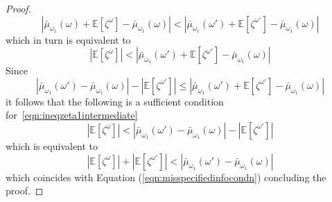 \documentclass[12pt,reqno]{amsart}
\begin{document}
\begin{proof}
\begin{equation*}
   \left\vert \bar{\mu}_{\omega_1}(\omega)+\mathbb{E}[\zeta^{\omega}]-\bar{\mu}_{\omega_1}(\omega )\right\vert <\left\vert 
\bar{\mu}_{\omega_1}(\omega')+\mathbb{E}[\zeta^{\omega'}]-\bar{\mu}_{\omega_1}(\omega )\right\vert 
\end{equation*}
which in turn is equivalent to
\begin{equation}\label{eqn:ineqzeta1intermediate} 
   \left\vert \mathbb{E}[\zeta^{\omega}]\right\vert <\left\vert 
\bar{\mu}_{\omega_1}(\omega')+\mathbb{E}[\zeta^{\omega'}]-\bar{\mu}_{\omega_1}(\omega )\right\vert
\end{equation}
Since 
\begin{equation}\label{eqn:ineqzeta1triangle} 
   \left\vert 
\bar{\mu}_{\omega_1}(\omega')-\bar{\mu}_{\omega_1}(\omega )\right\vert - \left \vert \mathbb{E}[\zeta^{\omega'}] \right \vert \leq \left\vert 
\bar{\mu}_{\omega_1}(\omega')+\mathbb{E}[\zeta^{\omega'}]-\bar{\mu}_{\omega_1}(\omega )\right\vert
\end{equation}
it follows that the following is a sufficient condition for~\eqref{eqn:ineqzeta1intermediate}
\begin{equation*}
    \left\vert \mathbb{E}[\zeta^{\omega}]\right\vert<\left\vert 
\bar{\mu}_{\omega_1}(\omega')-\bar{\mu}_{\omega_1}(\omega )\right\vert - \left \vert \mathbb{E}[\zeta^{\omega'}] \right \vert
\end{equation*}
which is equivalent to 
\begin{equation*}
    \left\vert \mathbb{E}[\zeta^{\omega}]\right\vert + \left \vert \mathbb{E}[\zeta^{\omega'}] \right \vert<\left\vert 
\bar{\mu}_{\omega_1}(\omega')-\bar{\mu}_{\omega_1}(\omega )\right\vert 
\end{equation*}
which coincides with Equation (\ref{eqn:misspecifiedinfocondn}) concluding the proof.
\end{proof}
\end{document}

